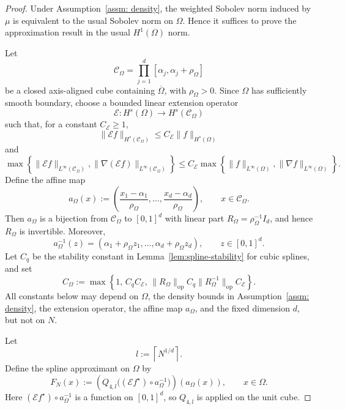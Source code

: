 \documentclass[10pt,a4paper]{amsart}
\begin{document}
\begin{proof}
Under Assumption~\ref{assm: density}, the weighted Sobolev norm induced by
\(\mu\) is equivalent to the usual Sobolev norm on \(\Omega\). Hence it
suffices to prove the approximation result in the usual \(H^1(\Omega)\) norm.

Let
\[
\mathcal C_\Omega
=
\prod_{j=1}^d[\alpha_j,\alpha_j+\rho_\Omega]
\]
be a closed axis-aligned cube containing \(\overline\Omega\), with
\(\rho_\Omega>0\). Since \(\Omega\) has sufficiently smooth boundary, choose a
bounded linear extension operator
\[
\mathcal E:H^s(\Omega)\to H^s(\mathcal C_\Omega)
\]
such that, for a constant \(C_{\mathcal E}\ge1\),
\[
\|\mathcal E f\|_{H^s(\mathcal C_\Omega)}
\le
C_{\mathcal E}\|f\|_{H^s(\Omega)}
\]
and
\[
\max\left\{
\|\mathcal E f\|_{L^\infty(\mathcal C_\Omega)},
\|\nabla(\mathcal E f)\|_{L^\infty(\mathcal C_\Omega)}
\right\}
\le
C_{\mathcal E}
\max\left\{
\|f\|_{L^\infty(\Omega)},
\|\nabla f\|_{L^\infty(\Omega)}
\right\}.
\]
Define the affine map
\[
a_\Omega(x)
:=
\left(
\frac{x_1-\alpha_1}{\rho_\Omega},
\ldots,
\frac{x_d-\alpha_d}{\rho_\Omega}
\right),
\qquad x\in \mathcal C_\Omega .
\]
Then \(a_\Omega\) is a bijection from \(\mathcal C_\Omega\) to \([0,1]^d\)
with linear part \(R_\Omega=\rho_\Omega^{-1}I_d\), and hence \(R_\Omega\) is
invertible. Moreover,
\[
a_\Omega^{-1}(z)
=
(\alpha_1+\rho_\Omega z_1,\ldots,\alpha_d+\rho_\Omega z_d),
\qquad z\in[0,1]^d .
\]
Let \(C_q\) be the stability constant in
Lemma~\ref{lem:spline-stability} for cubic splines, and set
\[
C_\Omega
:=
\max\left\{
1,\,
C_qC_{\mathcal E},\,
\|R_\Omega\|_{\mathrm{op}}C_q
\|R_\Omega^{-1}\|_{\mathrm{op}}C_{\mathcal E}
\right\}.
\]
All constants below may depend on \(\Omega\), the density bounds in
Assumption~\ref{assm: density}, the extension operator, the affine map
\(a_\Omega\), and the fixed dimension \(d\), but not on \(N\).

Let
\[
l:=\left\lceil N^{1/d}\right\rceil .
\]
Define the spline approximant on \(\Omega\) by
\begin{equation}\label{eq:def of F_N}
    F_N(x)
:=
\left(
Q_{4,l}\bigl((\mathcal E f^\star)\circ a_\Omega^{-1}\bigr)
\right)(a_\Omega(x)),
\qquad x\in\Omega .
\end{equation}
Here \((\mathcal E f^\star)\circ a_\Omega^{-1}\) is a function on
\([0,1]^d\), so \(Q_{4,l}\) is applied on the unit cube.


\end{proof}
\end{document}
